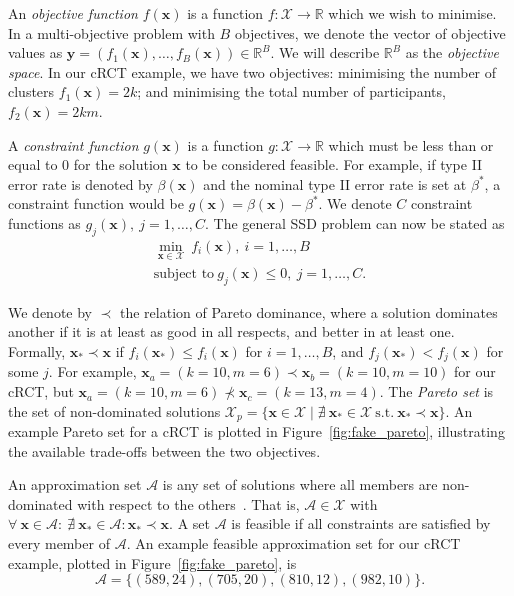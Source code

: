 \documentclass{article} %
\begin{document}
An \emph{objective function} $f(\mathbf{x})$ is a function $f : \mathcal{X} \rightarrow \mathbb{R}$ which we wish to minimise. In a multi-objective problem with $B$ objectives, we denote the vector of objective values as $\mathbf{y} = (f_{1}(\mathbf{x}), \ldots, f_{B}(\mathbf{x})) \in \mathbb{R}^{B}$. We will describe $\mathbb{R}^{B}$ as the \emph{objective space}. In our cRCT example, we have two objectives: minimising the number of clusters $f_1(\mathbf{x}) = 2k$; and minimising the total number of participants, $f_2(\mathbf{x}) = 2km$.

A \emph{constraint function} $g(\mathbf{x})$ is a function $g : \mathcal{X} \rightarrow \mathbb{R}$ which must be less than or equal to 0 for the solution $\mathbf{x}$ to be considered feasible. For example, if type II error rate is denoted by $\beta(\mathbf{x})$ and the nominal type II error rate is set at $\beta^{*}$, a constraint function would be $g(\mathbf{x}) = \beta(\mathbf{x}) - \beta^{*}$. We denote $C$ constraint functions as $g_{j}(\mathbf{x}),~j=1,\ldots , C$. The general SSD problem can now be stated as
\begin{align}
\min_{\mathbf{x} \in \mathcal{X}} {~ f_{i}(\mathbf{x})}, ~ i = 1, \ldots , B \\
\text{subject to} ~ g_{j}(\mathbf{x}) \leq 0, ~ j = 1, \ldots , C.
\end{align}

We denote by $\prec$ the relation of Pareto dominance, where a solution dominates another if it is at least as good in all respects, and better in at least one. Formally, $\mathbf{x}_{*} \prec \mathbf{x}$ if $f_{i}(\mathbf{x}_{*}) \leq f_{i}(\mathbf{x})$ for $i = 1, \ldots , B$, and $f_{j}(\mathbf{x}_{*}) < f_{j}(\mathbf{x})$ for some $j$. For example, $\mathbf{x}_a = (k=10, m=6) \prec \mathbf{x}_b = (k=10, m=10)$ for our cRCT, but $\mathbf{x}_a = (k=10, m=6) \nprec \mathbf{x}_c = (k=13, m=4)$. The \emph{Pareto set} is the set of non-dominated solutions $\mathcal{X}_{p} = \{\mathbf{x} \in \mathcal{X} \mid \nexists ~ \mathbf{x}_{*}  \in \mathcal{X} ~\text{s.t.}~ \mathbf{x}_{*} \prec \mathbf{x} \}$. An example Pareto set for a cRCT is plotted in Figure~\ref{fig:fake_pareto}, illustrating the available trade-offs between the two objectives.

An approximation set $\mathcal{A}$ is any set of solutions where all members are non-dominated with respect to the others~\cite{Emmerich2011}. That is, $\mathcal{A} \in \mathcal{X}$ with $\forall~\mathbf{x} \in \mathcal{A}:~\nexists~\mathbf{x}_{*} \in \mathcal{A} : \mathbf{x}_{*} \prec \mathbf{x}$. A set $\mathcal{A}$ is feasible if all constraints are satisfied by every member of $\mathcal{A}$. An example feasible approximation set for our cRCT example, plotted in Figure~\ref{fig:fake_pareto}, is 
\begin{equation}
\mathcal{A} = \{ (589, 24), (705, 20), (810, 12), (982, 10) \}.
\end{equation}
\end{document}

